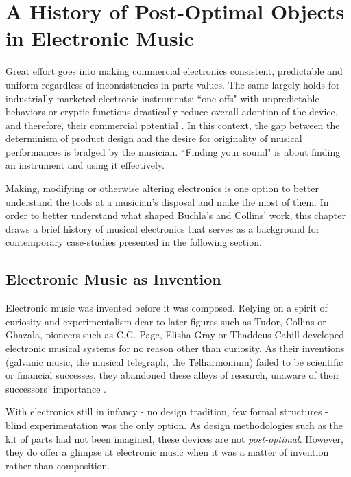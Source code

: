 \chapter{A History of Post-Optimal Objects in Electronic Music}\label{background}

Great effort goes into making commercial electronics consistent, predictable and uniform regardless of inconsistencies in parts values. The same largely holds for industrially marketed electronic instruments: ``one-offs" with unpredictable behaviors or cryptic functions drastically reduce overall adoption of the device, and therefore, their commercial potential \cite[p.5]{haslett2005}. In this context, the gap between the determinism of product design and the desire for originality of musical performances is bridged by the musician. ``Finding your sound" is about finding an instrument and using it effectively.  

Making, modifying or otherwise altering electronics is one option to better understand the tools at a musician's disposal and make the most of them. In order to better understand what shaped Buchla's and Collins' work, this chapter draws a brief history of musical electronics that serves as a background for contemporary case-studies presented in the following section.

\section{Electronic Music as Invention}

Electronic music was invented before it was composed. Relying on a spirit of curiosity and experimentalism dear to later figures such as Tudor, Collins or Ghazala, pioneers such as C.G. Page, Elisha Gray or Thaddeus Cahill developed electronic musical systems for no reason other than curiosity. As their inventions (galvanic music, the musical telegraph, the Telharmonium) failed to be scientific or financial successes, they abandoned these alleys of research, unaware of their successors' importance \citep{page1837,nasmyth1908,holmes2002}. 

With electronics still in infancy - no design tradition, few formal structures - blind experimentation was the only option. As design methodologies such as the kit of parts had not been imagined, these devices are not \textit{post-optimal}. However, they do offer a glimpse at  electronic music when it was a matter of invention rather than composition. 

